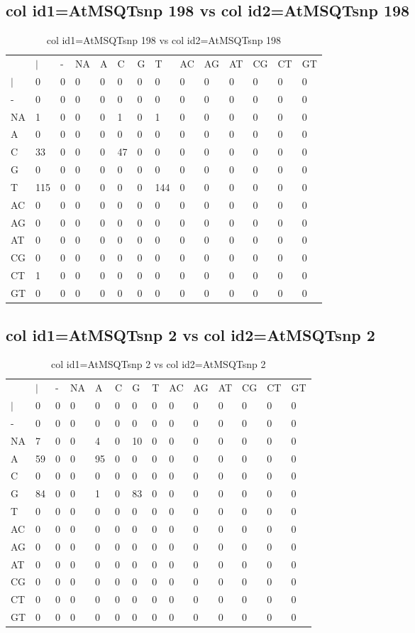 \subsection{col id1=AtMSQTsnp 198 vs col id2=AtMSQTsnp 198}
\begin{center}
\begin{longtable}{|l|l|l|l|l|l|l|l|l|l|l|l|l|l|}
\caption{col id1=AtMSQTsnp 198 vs col id2=AtMSQTsnp 198} \label{table_dm770}\\
\hline
\\
\hline
&$|$&-&NA&A&C&G&T&AC&AG&AT&CG&CT&GT\\
$|$&0&0&0&0&0&0&0&0&0&0&0&0&0\\
-&0&0&0&0&0&0&0&0&0&0&0&0&0\\
NA&1&0&0&0&1&0&1&0&0&0&0&0&0\\
A&0&0&0&0&0&0&0&0&0&0&0&0&0\\
C&33&0&0&0&47&0&0&0&0&0&0&0&0\\
G&0&0&0&0&0&0&0&0&0&0&0&0&0\\
T&115&0&0&0&0&0&144&0&0&0&0&0&0\\
AC&0&0&0&0&0&0&0&0&0&0&0&0&0\\
AG&0&0&0&0&0&0&0&0&0&0&0&0&0\\
AT&0&0&0&0&0&0&0&0&0&0&0&0&0\\
CG&0&0&0&0&0&0&0&0&0&0&0&0&0\\
CT&1&0&0&0&0&0&0&0&0&0&0&0&0\\
GT&0&0&0&0&0&0&0&0&0&0&0&0&0\\
\hline
\end{longtable}
\end{center}

\subsection{col id1=AtMSQTsnp 2 vs col id2=AtMSQTsnp 2}
\begin{center}
\begin{longtable}{|l|l|l|l|l|l|l|l|l|l|l|l|l|l|}
\caption{col id1=AtMSQTsnp 2 vs col id2=AtMSQTsnp 2} \label{table_dm772}\\
\hline
\\
\hline
&$|$&-&NA&A&C&G&T&AC&AG&AT&CG&CT&GT\\
$|$&0&0&0&0&0&0&0&0&0&0&0&0&0\\
-&0&0&0&0&0&0&0&0&0&0&0&0&0\\
NA&7&0&0&4&0&10&0&0&0&0&0&0&0\\
A&59&0&0&95&0&0&0&0&0&0&0&0&0\\
C&0&0&0&0&0&0&0&0&0&0&0&0&0\\
G&84&0&0&1&0&83&0&0&0&0&0&0&0\\
T&0&0&0&0&0&0&0&0&0&0&0&0&0\\
AC&0&0&0&0&0&0&0&0&0&0&0&0&0\\
AG&0&0&0&0&0&0&0&0&0&0&0&0&0\\
AT&0&0&0&0&0&0&0&0&0&0&0&0&0\\
CG&0&0&0&0&0&0&0&0&0&0&0&0&0\\
CT&0&0&0&0&0&0&0&0&0&0&0&0&0\\
GT&0&0&0&0&0&0&0&0&0&0&0&0&0\\
\hline
\end{longtable}
\end{center}


